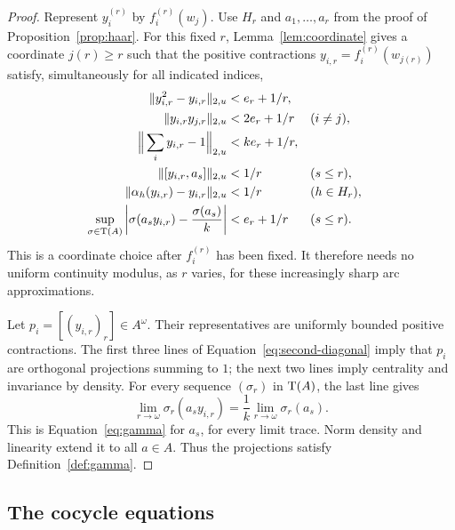 \begin{proof}
Represent \(y_i^{(r)}\) by \(f_i^{(r)}(w_j)\).
Use \(H_r\) and \(a_1,\ldots,a_r\) from the proof of
Proposition~\ref{prop:haar}.
For this fixed \(r\), Lemma~\ref{lem:coordinate} gives a coordinate
\(j(r)\geq r\) such that the positive contractions
\(y_{i,r}=f_i^{(r)}(w_{j(r)})\) satisfy, simultaneously for all
indicated indices,
\begin{align}
 \|y_{i,r}^2-y_{i,r}\|_{2,u}&<e_r+1/r,\label{eq:second-diagonal}\\
 \|y_{i,r}y_{j,r}\|_{2,u}&<2e_r+1/r &&(i\ne j),\notag\\
 \Big\|\sum_i y_{i,r}-1\Big\|_{2,u}&<ke_r+1/r,\notag\\
 \|[y_{i,r},a_s]\|_{2,u}&<1/r &&(s\leq r),\notag\\
 \|\alpha_h(y_{i,r})-y_{i,r}\|_{2,u}&<1/r &&(h\in H_r),\notag\\
 \sup_{\sigma\in\operatorname{T}(A)}
 \left|\sigma(a_s y_{i,r})-\frac{\sigma(a_s)}k\right|
   &<e_r+1/r &&(s\leq r).\notag
\end{align}
This is a coordinate choice after \(f_i^{(r)}\) has been fixed.
It therefore needs no uniform continuity modulus, as \(r\) varies,
for these increasingly sharp arc approximations.

Let \(p_i=[(y_{i,r})_r]\in A^\omega\).
Their representatives are uniformly bounded positive contractions.
The first three lines of Equation~\eqref{eq:second-diagonal} imply
that \(p_i\) are orthogonal projections summing to \(1\); the next
two lines imply centrality and invariance by density.
For every sequence \((\sigma_r)\) in \(\operatorname{T}(A)\), the last line gives
\[
 \lim_{r\to\omega}\sigma_r(a_s y_{i,r})
   =\frac1k\lim_{r\to\omega}\sigma_r(a_s).
\]
This is Equation~\eqref{eq:gamma} for \(a_s\), for every limit trace.
Norm density and linearity extend it to all \(a\in A\).
Thus the projections satisfy Definition~\ref{def:gamma}.
\end{proof}

\subsection{The cocycle equations}

